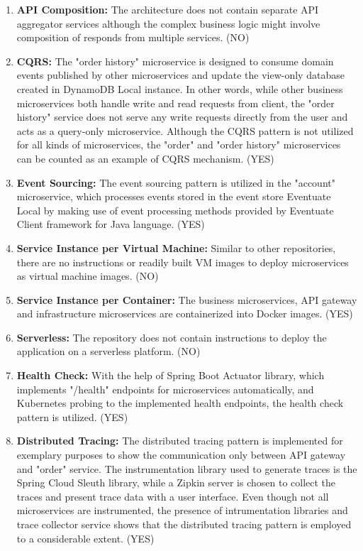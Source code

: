 \documentclass{Configuration_Files/PoliMi3i_thesis}
\begin{document}
\begin{enumerate}
    \item \textbf{API Composition:} The architecture does not contain separate API aggregator services although the complex business logic might involve composition of responds from multiple services. (NO)
    
    \item \textbf{CQRS:} The "order history" microservice is designed to consume domain events published by other microservices and update the view-only database created in DynamoDB Local instance.
    In other words, while other business microservices both handle write and read requests from client, the "order history" service does not serve any write requests directly from the user and acts as a query-only microservice.
    Although the CQRS pattern is not utilized for all kinds of microservices, the "order" and "order history" microservices can be counted as an example of CQRS mechanism. (YES)
    
    \item \textbf{Event Sourcing:} The event sourcing pattern is utilized in the "account" microservice, which processes events stored in the event store Eventuate Local by making use of event processing methods provided by Eventuate Client framework for Java language. (YES)
    
    \item \textbf{Service Instance per Virtual Machine:} Similar to other repositories, there are no instructions or readily built VM images to deploy microservices as virtual machine images. (NO)
    
    \item \textbf{Service Instance per Container:} The business microservices, API gateway and infrastructure microservices are containerized into Docker images. (YES)
    
    \item \textbf{Serverless:} The repository does not contain instructions to deploy the application on a serverless platform. (NO)
    
    \item \textbf{Health Check:} With the help of Spring Boot Actuator library, which implements "/health" endpoints for microservices automatically, and Kubernetes probing to the implemented health endpoints, the health check pattern is utilized. (YES)
    
    \item \textbf{Distributed Tracing:} The distributed tracing pattern is implemented for exemplary purposes to show the communication only between API gateway and "order" service.
    The instrumentation library used to generate traces is the Spring Cloud Sleuth library, while a Zipkin server is chosen to collect the traces and present trace data with a user interface.
    Even though not all microservices are instrumented, the presence of intrumentation libraries and trace collector service shows that the distributed tracing pattern is employed to a considerable extent. (YES)
    

\end{enumerate}
\end{document}

